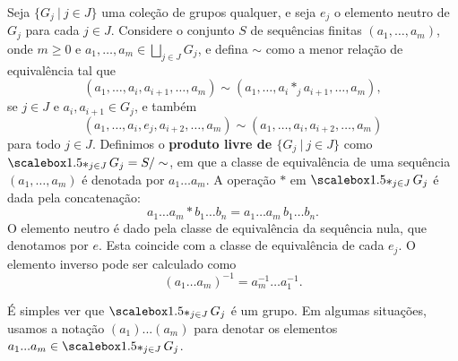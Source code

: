 \begin{defi}
	Seja $\{G_j~|~j\in J\}$ uma coleção de grupos qualquer, e seja $e_j$ o elemento neutro de $G_j$ para cada $j\in J$. Considere o conjunto $S$ de sequências finitas
    $(a_1, \ldots, a_m)$, onde $m\geq 0$ e $a_1,\ldots, a_m \in \bigsqcup_{j\in J} G_j$, e defina $\sim$ como a menor relação de equivalência tal que 
    \[(a_1,\ldots, a_i, a_{i+1},\ldots, a_m) \sim 
    (a_1,\ldots, a_i *_j a_{i+1},\ldots, a_m),\] se $j\in J$ e $a_i, a_{i+1} \in G_j$, e também
    \[(a_1,\ldots, a_i, e_j, a_{i+2},\ldots, a_m) \sim (a_1,\ldots, a_i, a_{i+2},\ldots, a_m)\]
    para todo $j\in J$. Definimos o \textbf{produto livre de $\{G_j~|~j\in J\}$} como $\Ast_{j\in J} G_j = S/\sim$, em que a classe de equivalência de uma sequência $(a_1,\ldots, a_m)$ é denotada por $a_1 \ldots a_m$. A operação $*$ em $\Ast_{j\in J} G_j$ é dada pela concatenação:
    \[a_1 \ldots a_m * b_1 \ldots b_n = a_1 \ldots a_m \, b_1 \ldots b_n.\]
    O elemento neutro é dado pela classe de equivalência da sequência nula, que denotamos por $e$. Esta coincide com a classe de equivalência de cada $e_j$. O elemento inverso pode ser calculado como
    \[(a_1 \ldots a_m)^{-1} = a_m^{-1} \ldots a_1^{-1}.\]
    
    É simples ver que $\Ast_{j\in J} G_j$ é um grupo. Em algumas situações, usamos a notação $(a_1)...(a_m)$ para denotar os elementos $a_1...a_m\in \Ast_{j\in J} G_j $.
\end{defi}

